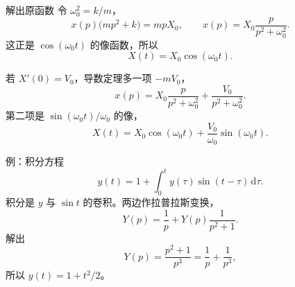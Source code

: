 \documentclass[fontset=windows, chinese, 10pt, xcolor=dvipsnames]{beamer}
\begin{document}
\begin{frame}{解出原函数}
  令 $\omega_0^2=k/m$，
  \begin{equation*}
    x(p)\bigl(mp^2+k\bigr)=mp X_0,
    \qquad
    x(p)=X_0\frac{p}{p^2+\omega_0^2}.
  \end{equation*}
  这正是 $\cos(\omega_0 t)$ 的像函数，所以
  \begin{equation*}
    X(t)=X_0\cos(\omega_0 t).
  \end{equation*}
  \vspace{0.4em}

  若 $X'(0)=V_0$，导数定理多一项 $-m V_0$，
  \begin{equation*}
    x(p)=X_0\frac{p}{p^2+\omega_0^2}
        +\frac{V_0}{p^2+\omega_0^2}.
  \end{equation*}
  第二项是 $\sin(\omega_0 t)/\omega_0$ 的像，
  \begin{equation*}
    X(t)=X_0\cos(\omega_0 t)
         +\frac{V_0}{\omega_0}\sin(\omega_0 t).
  \end{equation*}
\end{frame}

\begin{frame}{例：积分方程}
  \begin{equation*}
    y(t)=1+\int_0^t y(\tau)\sin(t-\tau)\,\mathrm{d}\tau.
  \end{equation*}
  积分是 $y$ 与 $\sin t$ 的卷积。两边作拉普拉斯变换，
  \begin{equation*}
    Y(p)=\frac{1}{p}+Y(p)\frac{1}{p^2+1}.
  \end{equation*}
  解出
  \begin{equation*}
    Y(p)=\frac{p^2+1}{p^3}=\frac{1}{p}+\frac{1}{p^3},
  \end{equation*}
  所以 $y(t)=1+t^2/2$。
\end{frame}

\end{document}
